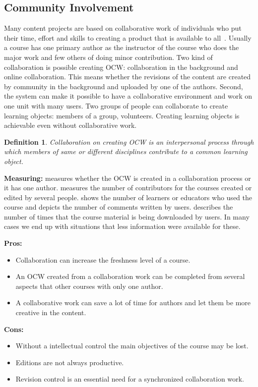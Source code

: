 \documentclass{sig-alternate}
\theoremstyle{definition}
\newtheorem{defn}{Definition}
\begin{document}
\subsection{Community Involvement}
\label{sec:Involvement}
Many content projects are based on collaborative work of individuals who put their time, effort and skills to creating a product that is available to all~\parencite{Oreg.2008}.
Usually a course has one primary author as the instructor of the course who does the major work and few others of doing minor contribution.
Two kind of collaboration is possible creating OCW: collaboration in the background and online collaboration.
This means whether the revisions of the content are created by community in the background and uploaded by one of the authors.
Second, the system can make it possible to have a collaborative environment and work on one unit with many users.
Two groups of people can collaborate to create learning objects: members of a group, volunteers.
Creating learning objects is achievable even without collaborative work.



\begin{defn}
\emph {Collaboration on creating OCW is an interpersonal process through which members of same or different disciplines contribute to a common learning object.}
\end{defn}

\noindent\textbf{Measuring:}
 measures whether the OCW is created in a collaboration process or it has one author.
 measures the number of contributors for the courses created or edited by several people.
 shows the number of learners or educators who used the course and  depicts the number of comments written by users.
 describes the number of times that the course material is being downloaded by users.
In many cases we end up with situations that less information were available for these.

\noindent\textbf{Pros:}
\begin{itemize}
\item Collaboration can increase the freshness level of a course.
\item An OCW created from a collaboration work can be completed from several aspects that other courses with only one author.
\item A collaborative work can save a lot of time for authors and let them be more creative in the content.
\end{itemize}
\noindent\textbf{Cons:}
\begin{itemize}
\item Without a intellectual control the main objectives of the course may be lost.
\item Editions are not always productive.
\item Revision control is an essential need for a synchronized collaboration work.
\end{itemize}
\end{document}
